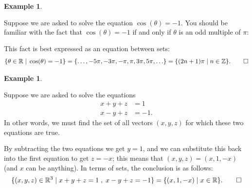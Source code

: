 \documentclass[a4paper]{book}
\newcommand{\Z}         {{\mathbb{Z}}}
\newcommand{\R}         {{\mathbb{R}}}
\newcommand{\tht}       {\theta}
\newcommand{\st}        {\;|\;}
\renewcommand{\:}{\colon}
\newcommand{\bilabel}[1]{\hypertarget{#1}{\label{#1}}}
\theoremstyle{definition}
\newtheorem{example}[theorem]{Example}
\begin{document}
\begin{example}\bilabel{eg-cosmin}
 Suppose we are asked to solve the equation $\cos(\tht)=-1$.  You
 should be familiar with the fact that $\cos(\tht)=-1$ if and only if
 $\tht$ is an odd multiple of $\pi$:
 \begin{center}
 \end{center}
 This fact is best expressed as an equation between sets:
 \[ \{\tht\in\R\st\cos(\tht)=-1\} =
    \{\ldots,-5\pi,-3\pi,-\pi,\pi,3\pi,5\pi,\ldots\} =
    \{(2n+1)\pi\st n\in\Z\}. \qed
 \]
\end{example}

\begin{example}\bilabel{eg-sols-linear}
 Suppose we are asked to solve the equations
 \begin{align*}
  x + y + z &= 1 \\
  x - y + z &= -1.
 \end{align*}
 In other words, we must find the set of all vectors $(x,y,z)$ for
 which these two equations are true.

 By subtracting the two equations we get $y=1$, and we can substitute
 this back into the first equation to get $z=-x$; this means that
 $(x,y,z)=(x,1,-x)$ (and $x$ can be anything).  In terms of sets, the
 conclusion is as follows:
 \[
  \{(x,y,z)\in\R^3\st x+y+z=1 \;,\; x-y+z=-1\} =
    \{(x,1,-x)\st x\in\R\}. \qed
 \]
\end{example}
\end{document}
